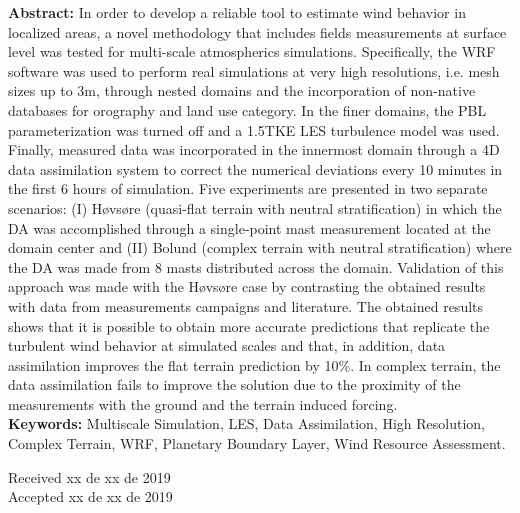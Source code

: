 \textbf{Abstract:}
In order to develop a reliable tool to estimate wind behavior in localized areas, a novel methodology that includes fields measurements at surface level was tested for multi-scale atmospherics simulations.
%
Specifically, the WRF software was used to perform real simulations at very high resolutions, i.e. mesh sizes up to 3m, through nested domains and the incorporation of non-native databases for orography and land use category. 
%
In the finer domains, the PBL parameterization was turned off and a 1.5TKE LES turbulence model was used. 
%
Finally, measured data was incorporated in the innermost domain through a 4D data assimilation system to correct the numerical deviations every 10 minutes in the first 6 hours of simulation. 
%
Five experiments are presented in two separate scenarios: (I) Høvsøre (quasi-flat terrain with neutral stratification) in which the DA was accomplished through a single-point mast measurement located at the domain center and (II) Bolund (complex terrain with neutral stratification) where the DA was made from 8 masts distributed across the domain.
%
Validation of this approach was made with the Høvsøre case by contrasting the obtained results with data from measurements campaigns and literature.
%
The obtained results shows that it is possible to obtain more accurate predictions
that replicate the turbulent wind behavior at simulated scales and that, in addition,
data assimilation improves the flat terrain prediction by 10\%. In complex terrain,
the data assimilation fails to improve the solution due to the proximity of the
measurements with the ground and the terrain induced forcing.\\
\textbf{Keywords:} Multiscale Simulation, LES, Data Assimilation, High Resolution, Complex Terrain, WRF, Planetary Boundary Layer, Wind Resource Assessment.

\bigskip
Received xx de xx de 2019\\
Accepted xx de xx de 2019 